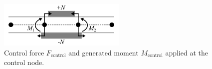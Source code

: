 \documentclass{article}
\begin{document}
	\begin{figure}[H]
		\centering
		\includegraphics[width=2.4in]{Figures/ControlForces_Figure.png}
		\caption{Control force \( F_{\text{control}} \) and generated moment \( M_{\text{control}} \) applied at the control node.}
		\label{fig:control_forces}
	\end{figure}
	
	
\end{document}
